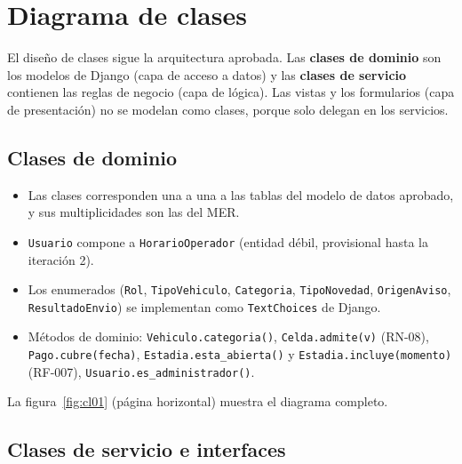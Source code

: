 \chapter{Diagrama de clases}\label{cap:clases}

El diseño de clases sigue la arquitectura aprobada. Las \textbf{clases de dominio} son los modelos de Django (capa de acceso a datos) y las \textbf{clases de servicio} contienen las reglas de negocio (capa de lógica). Las vistas y los formularios (capa de presentación) no se modelan como clases, porque solo delegan en los servicios.

\section{Clases de dominio}

\begin{itemize}
  \item Las clases corresponden una a una a las tablas del modelo de datos aprobado, y sus multiplicidades son las del MER.
  \item \texttt{Usuario} compone a \texttt{HorarioOperador} (entidad débil, provisional hasta la iteración 2).
  \item Los enumerados (\texttt{Rol}, \texttt{TipoVehiculo}, \texttt{Categoria}, \texttt{TipoNovedad}, \texttt{OrigenAviso}, \texttt{ResultadoEnvio}) se implementan como \texttt{TextChoices} de Django.
  \item Métodos de dominio: \texttt{Vehiculo.categoria()}, \texttt{Celda.admite(v)} (RN-08), \texttt{Pago.cubre(fecha)}, \texttt{Estadia.esta\_abierta()} y \texttt{Estadia.incluye(momento)} (RF-007), \texttt{Usuario.es\_administrador()}.
\end{itemize}

La figura~\ref{fig:cl01} (página horizontal) muestra el diagrama completo.

\section{Clases de servicio e interfaces}

